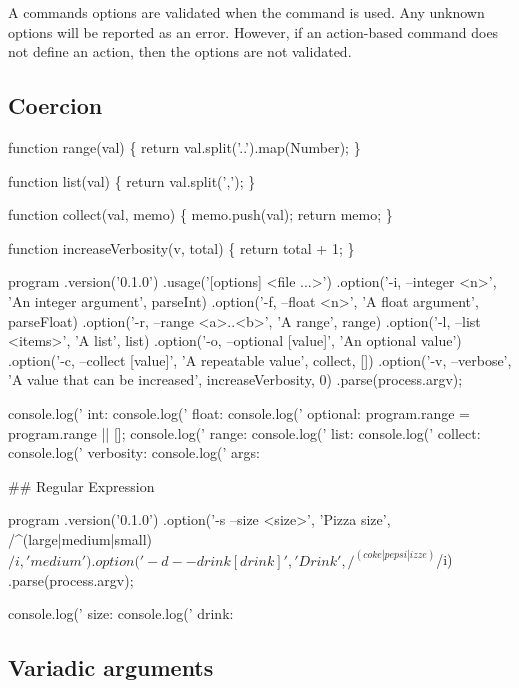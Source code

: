 A command\textquotesingle{}s options are validated when the command is used. Any unknown options will be reported as an error. However, if an action-\/based command does not define an action, then the options are not validated.

\subsection*{Coercion}


\begin{DoxyCode}
function range(val) \{
  return val.split('..').map(Number);
\}

function list(val) \{
  return val.split(',');
\}

function collect(val, memo) \{
  memo.push(val);
  return memo;
\}

function increaseVerbosity(v, total) \{
  return total + 1;
\}

program
  .version('0.1.0')
  .usage('[options] <file ...>')
  .option('-i, --integer <n>', 'An integer argument', parseInt)
  .option('-f, --float <n>', 'A float argument', parseFloat)
  .option('-r, --range <a>..<b>', 'A range', range)
  .option('-l, --list <items>', 'A list', list)
  .option('-o, --optional [value]', 'An optional value')
  .option('-c, --collect [value]', 'A repeatable value', collect, [])
  .option('-v, --verbose', 'A value that can be increased', increaseVerbosity, 0)
  .parse(process.argv);

console.log(' int: %
console.log(' float: %
console.log(' optional: %
program.range = program.range || [];
console.log(' range: %
console.log(' list: %
console.log(' collect: %
console.log(' verbosity: %
console.log(' args: %
\end{DoxyCode}


\#\# Regular Expression 
\begin{DoxyCode}
program
  .version('0.1.0')
  .option('-s --size <size>', 'Pizza size', /^(large|medium|small)$/i, 'medium')
  .option('-d --drink [drink]', 'Drink', /^(coke|pepsi|izze)$/i)
  .parse(process.argv);

console.log(' size: %
console.log(' drink: %
\end{DoxyCode}


\subsection*{Variadic arguments}

